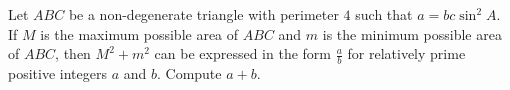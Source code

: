 Let $ABC$ be a non-degenerate triangle with perimeter $4$ such that $a=bc\sin^2A$. If $M$ is the maximum possible area of $ABC$ and $m$ is the minimum possible area of $ABC$, then $M^2+m^2$ can be expressed in the form $\frac{a}{b}$ for relatively prime positive integers $a$ and $b$. Compute $a+b$.